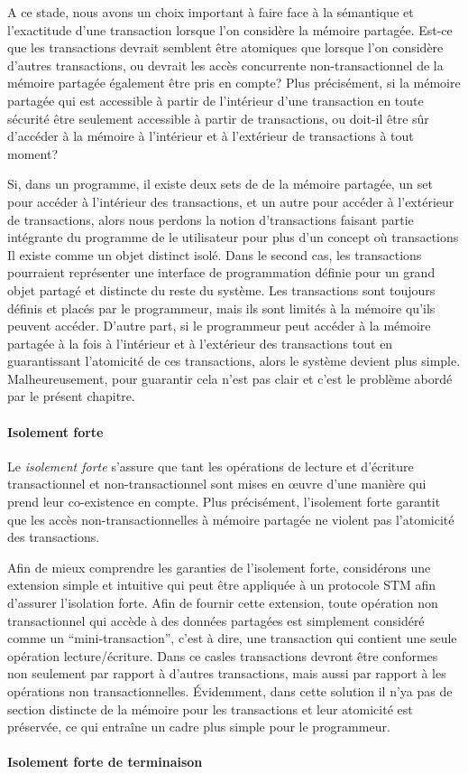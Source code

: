 A ce stade, nous avons un choix important à faire face à la sémantique et l'exactitude d'une transaction lorsque l'on considère la mémoire partagée.
Est-ce que les transactions devrait semblent être atomiques que lorsque l'on considère d'autres transactions, ou devrait les accès concurrente non-transactionnel de la mémoire partagée également être pris en compte?
Plus précisément, si la mémoire partagée qui est accessible à partir de l'intérieur d'une transaction en
toute sécurité être seulement accessible à partir de transactions, ou doit-il être sûr d'accéder à la mémoire à l'intérieur et à l'extérieur de transactions à tout moment?


Si, dans un programme, il existe deux sets de de la mémoire partagée, un set pour accéder à l'intérieur des transactions,
et un autre pour accéder à l'extérieur de transactions, alors nous perdons la notion d'transactions faisant partie
intégrante du programme de le utilisateur pour plus d'un concept où transactions Il existe comme un objet distinct isolé.
Dans le second cas, les transactions pourraient représenter une interface de programmation définie pour un grand objet partagé et distincte du reste du système.
Les transactions sont toujours définis et placés par le programmeur, mais ils sont limités à la mémoire qu'ils peuvent accéder.
D'autre part, si le programmeur peut accéder à la mémoire partagée à la fois à l'intérieur et à l'extérieur des transactions
tout en guarantissant l'atomicité de ces transactions, alors le système devient plus simple.
Malheureusement, pour guarantir cela n'est pas clair et c'est le problème abordé par le présent chapitre.



\paragraph{Isolement forte}

Le \emph{isolement forte} s'assure que tant les opérations de lecture et d'écriture transactionnel et non-transactionnel sont mises en œuvre d'une manière qui prend leur co-existence en compte.
Plus précisément, l'isolement forte garantit que les accès non-transactionnelles à mémoire partagée ne violent pas l'atomicité des transactions.



Afin de mieux comprendre les garanties de l'isolement forte, considérons une extension simple et intuitive qui peut être appliquée à un protocole STM afin d'assurer l'isolation forte.
Afin de fournir cette extension, toute opération non transactionnel qui accède à des données partagées est simplement considéré comme un ``mini-transaction'', c'est à dire, une transaction qui contient une seule opération lecture/écriture.
Dans ce casles transactions devront être conformes non seulement par rapport à d'autres transactions, mais aussi par rapport à les opérations non transactionnelles.
Évidemment, dans cette solution il n'ya pas de section distincte de la mémoire pour les transactions et leur atomicité est préservée, ce qui entraîne un cadre plus simple pour le programmeur.


\paragraph{Isolement forte de terminaison}
